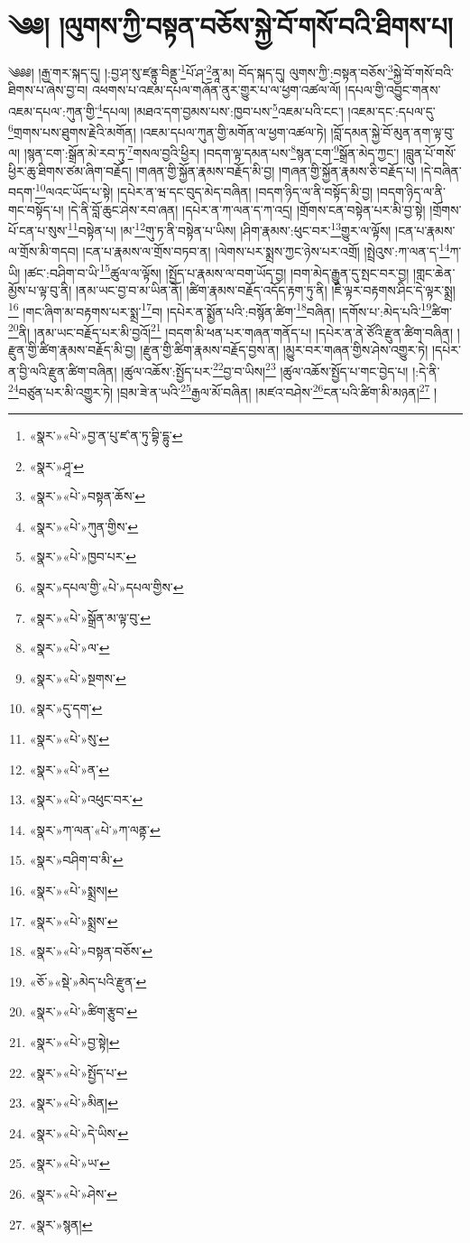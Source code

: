 \chapter{༄༅། །ལུགས་ཀྱི་བསྟན་བཅོས་སྐྱེ་བོ་གསོ་བའི་ཐིགས་པ།}༄༅༅། །རྒྱ་གར་སྐད་དུ། །:བྱ་ཤ་སུ་ཛནྟུ་བིནྡུ་\footnote{«སྣར་»«པེ་»བྱ་ན་པུ་ཛ་ན་ཏུ་བྷི་དྷུ་}པོ་ཤ་\footnote{«སྣར་»ཤཱ་}ནཱ་མ། བོད་སྐད་དུ། ལུགས་ཀྱི་:བསྟན་བཅོས་\footnote{«སྣར་»«པེ་»བསྟན་ཆོས་}སྐྱེ་བོ་གསོ་བའི་ཐིགས་པ་ཞེས་བྱ་བ། འཕགས་པ་འཇམ་དཔལ་གཞོན་ནུར་གྱུར་པ་ལ་ཕྱག་འཚལ་ལོ། །དཔལ་གྱི་འབྱུང་གནས་འཇམ་དཔལ་:ཀུན་གྱི་\footnote{«སྣར་»«པེ་»ཀུན་གྱིས་}དཔལ། །མཐའ་དག་བྱམས་པས་:ཁྱབ་པས་\footnote{«སྣར་»«པེ་»ཁྱབ་པར་}འཇམ་པའི་ངང་། །འཇམ་དང་:དཔལ་དུ་\footnote{«སྣར་»དཔལ་གྱི་«པེ་»དཔལ་གྱིས་}གྲགས་པས་ཐུགས་རྗེའི་མགོན། །འཇམ་དཔལ་ཀུན་གྱི་མགོན་ལ་ཕྱག་འཚལ་ཏེ། །བློ་དམན་སྐྱེ་བོ་མུན་ནག་ལྟ་བུ་ལ། །སྙན་ངག་:སྒྲོན་མེ་རབ་ཏུ་\footnote{«སྣར་»«པེ་»སྒྲོན་མ་ལྟ་བུ་}གསལ་བྱའི་ཕྱིར། །བདག་ལྟ་དམན་པས་\footnote{«སྣར་»«པེ་»ལ་}སྙན་ངག་\footnote{«སྣར་»«པེ་»སྔགས་}སྒྲོན་མེད་ཀྱང་། །བླུན་པོ་གསོ་ཕྱིར་ཆུ་ཐིགས་ཙམ་ཞིག་བརྗོད། །གཞན་གྱི་སྐྱོན་རྣམས་བརྗོད་མི་བྱ། །གཞན་གྱི་སྐྱོན་རྣམས་ཅི་བརྗོད་པ། །དེ་བཞིན་བདག་\footnote{«སྣར་»དུ་དག་}ལའང་ཡོད་པ་སྟེ། །དཔེར་ན་ཝ་དང་བུད་མེད་བཞིན། །བདག་ཉིད་ལ་ནི་བསྟོད་མི་བྱ། །བདག་ཉིད་ལ་ནི་གང་བསྟོད་པ། །དེ་ནི་བློ་ཆུང་ཤེས་རབ་ཞན། །དཔེར་ན་ཀ་ལན་ད་ཀ་འདྲ། །གྲོགས་ངན་བསྟེན་པར་མི་བྱ་སྟེ། །གྲོགས་པོ་ངན་པ་སུས་\footnote{«སྣར་»«པེ་»སུ་}བསྟེན་པ། །མ་\footnote{«སྣར་»«པེ་»ན་}གུ་ཏ་ནི་བསྟེན་པ་ཡིས། །ཤིག་རྣམས་:ཕུང་བར་\footnote{«སྣར་»«པེ་»འཕུང་བར་}གྱུར་ལ་ལྟོས། །ངན་པ་རྣམས་ལ་གྲོས་མི་གདབ། །ངན་པ་རྣམས་ལ་གྲོས་བཏབ་ན། །ལེགས་པར་སྨྲས་ཀྱང་ཉེས་པར་འགྲོ། །སྤྲེའུས་:ཀ་ལན་ད་\footnote{«སྣར་»ཀ་ལན་«པེ་»ཀ་ལནྟ་}ཀ་ཡི། །ཚང་:བཤིག་བ་ཡི་\footnote{«སྣར་»བཤིག་བ་མི་}ཚུལ་ལ་ལྟོས། །སྤྱོད་པ་རྣམས་ལ་བག་ཡོད་བྱ། །བག་མེད་རྒྱུན་དུ་སྤང་བར་བྱ། །གླང་ཆེན་མྱོས་པ་ལྟ་བུ་ནི། །ནམ་ཡང་བྱ་བ་མ་ཡིན་ནོ། །ཚིག་རྣམས་བརྗོད་འདོད་རྟག་ཏུ་ནི། །ཇི་ལྟར་བརྟགས་ཤིང་དེ་ལྟར་སྨྲ།\footnote{«སྣར་»«པེ་»སྨྲས།} །གང་ཞིག་མ་བརྟགས་པར་སྨྲ་\footnote{«སྣར་»«པེ་»སྨྲས་}བ། །དཔེར་ན་སྨྱོན་པའི་:བསྙོན་ཚིག་\footnote{«སྣར་»«པེ་»བསྟན་བཅོས་}བཞིན། །དགོས་པ་:མེད་པའི་\footnote{«ཅོ་»«སྡེ་»མེད་པའི་རྫུན་}ཚིག་\footnote{«སྣར་»«པེ་»ཚིག་རྩུབ་}ནི། །ནམ་ཡང་བརྗོད་པར་མི་བྱའོ།\footnote{«སྣར་»«པེ་»བྱ་སྟེ།} །བདག་མི་ཕན་པར་གཞན་གནོད་པ། །དཔེར་ན་ནེ་ཙོའི་རྫུན་ཚིག་བཞིན། །རྫུན་གྱི་ཚིག་རྣམས་བརྗོད་མི་བྱ། །རྫུན་གྱི་ཚིག་རྣམས་བརྗོད་བྱས་ན། །མྱུར་བར་གཞན་གྱིས་ཤེས་འགྱུར་ཏེ། །དཔེར་ན་བྱི་ལའི་རྫུན་ཚིག་བཞིན། །ཚུལ་འཆོས་:སྤྱོད་པར་\footnote{«སྣར་»«པེ་»སྤྱོད་པ་}བྱ་བ་ཡིས།\footnote{«སྣར་»«པེ་»མིན།} །ཚུལ་འཆོས་སྤྱོད་པ་གང་བྱེད་པ། །:དེ་ནི་\footnote{«སྣར་»«པེ་»དེ་ཡིས་}བཙུན་པར་མི་འགྱུར་ཏེ། །བྲམ་ཟེ་ན་ཡའི་\footnote{«སྣར་»«པེ་»ཡ་}རྒྱལ་མོ་བཞིན། །མཛའ་བཤེས་\footnote{«སྣར་»«པེ་»ཤེས་}ངན་པའི་ཚིག་མི་མཉན།\footnote{«སྣར་»སྙན།} །
